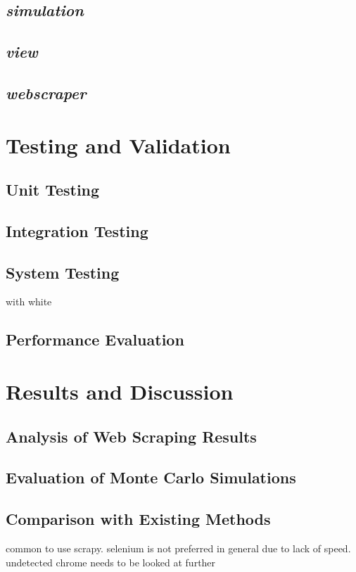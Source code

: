 \documentclass{thesis-ekf}
\theoremstyle{definition}
\theoremstyle{remark}
\begin{document}
\section{\emph{simulation}}
\section{\emph{view}}
\section{\emph{webscraper}} \label{sec-webscraper}


\chapter{Testing and Validation} \label{ch-testing}

\section{Unit Testing}
\section{Integration Testing}
\section{System Testing}
with white
\section{Performance Evaluation}

\chapter{Results and Discussion}
\section{Analysis of Web Scraping Results}
\section{Evaluation of Monte Carlo Simulations}
\section{Comparison with Existing Methods}
common to use scrapy. selenium is not preferred in general due to lack of speed. undetected chrome needs to be looked at further
\end{document}
